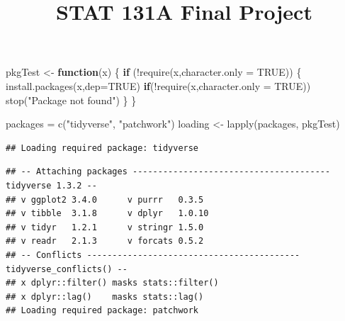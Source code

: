 \documentclass[
]{article}
\title{STAT 131A Final Project}
\author{}
\date{\vspace{-2.5em}}
\newenvironment{Shaded}{\begin{snugshade}}{\end{snugshade}}
\newcommand{\AttributeTok}[1]{\textcolor[rgb]{0.77,0.63,0.00}{#1}}
\newcommand{\ConstantTok}[1]{\textcolor[rgb]{0.00,0.00,0.00}{#1}}
\newcommand{\ControlFlowTok}[1]{\textcolor[rgb]{0.13,0.29,0.53}{\textbf{#1}}}
\newcommand{\DecValTok}[1]{\textcolor[rgb]{0.00,0.00,0.81}{#1}}
\newcommand{\FunctionTok}[1]{\textcolor[rgb]{0.00,0.00,0.00}{#1}}
\newcommand{\NormalTok}[1]{#1}
\newcommand{\OtherTok}[1]{\textcolor[rgb]{0.56,0.35,0.01}{#1}}
\newcommand{\SpecialCharTok}[1]{\textcolor[rgb]{0.00,0.00,0.00}{#1}}
\newcommand{\StringTok}[1]{\textcolor[rgb]{0.31,0.60,0.02}{#1}}
\begin{document}
\maketitle

\begin{Shaded}
\end{Shaded}

\begin{Shaded}
\begin{Highlighting}[]
\NormalTok{pkgTest }\OtherTok{\textless{}{-}} \ControlFlowTok{function}\NormalTok{(x) \{}
  \ControlFlowTok{if}\NormalTok{ (}\SpecialCharTok{!}\FunctionTok{require}\NormalTok{(x,}\AttributeTok{character.only =} \ConstantTok{TRUE}\NormalTok{)) \{}
    \FunctionTok{install.packages}\NormalTok{(x,}\AttributeTok{dep=}\ConstantTok{TRUE}\NormalTok{)}
    \ControlFlowTok{if}\NormalTok{(}\SpecialCharTok{!}\FunctionTok{require}\NormalTok{(x,}\AttributeTok{character.only =} \ConstantTok{TRUE}\NormalTok{)) }\FunctionTok{stop}\NormalTok{(}\StringTok{"Package not found"}\NormalTok{)}
\NormalTok{  \}}
\NormalTok{\}}

\NormalTok{packages }\OtherTok{=} \FunctionTok{c}\NormalTok{(}\StringTok{"tidyverse"}\NormalTok{, }\StringTok{"patchwork"}\NormalTok{)}
\NormalTok{loading }\OtherTok{\textless{}{-}} \FunctionTok{lapply}\NormalTok{(packages, pkgTest)}
\end{Highlighting}
\end{Shaded}

\begin{verbatim}
## Loading required package: tidyverse
\end{verbatim}

\begin{verbatim}
## -- Attaching packages --------------------------------------- tidyverse 1.3.2 --
## v ggplot2 3.4.0      v purrr   0.3.5 
## v tibble  3.1.8      v dplyr   1.0.10
## v tidyr   1.2.1      v stringr 1.5.0 
## v readr   2.1.3      v forcats 0.5.2 
## -- Conflicts ------------------------------------------ tidyverse_conflicts() --
## x dplyr::filter() masks stats::filter()
## x dplyr::lag()    masks stats::lag()
## Loading required package: patchwork
\end{verbatim}
\end{document}
